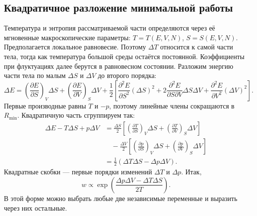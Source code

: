 \documentclass[../final.tex]{subfiles}
\begin{document}
\subsection{Квадратичное разложение минимальной работы}
Температура и энтропия рассматриваемой части определяются через её
мгновенные макроскопические параметры: $T=T(E,V,N)$, $S=S(E,V,N)$.
Предполагается локальное равновесие. Поэтому $\Delta T$ относится к самой
части тела, тогда как температура большой среды остаётся постоянной.
Коэффициенты при флуктуациях далее берутся в равновесном состоянии.
Разложим энергию части тела по малым $\Delta S$ и $\Delta V$
до второго порядка:
\begin{equation*}
 \Delta E=\left(\frac{\partial E}{\partial S}\right)_V\Delta S
 +\left(\frac{\partial E}{\partial V}\right)_S\Delta V
 +\frac12\left[\frac{\partial^2E}{\partial S^2}(\Delta S)^2
 +2\frac{\partial^2E}{\partial S\partial V}\Delta S\Delta V
 +\frac{\partial^2E}{\partial V^2}(\Delta V)^2\right].
\end{equation*}
Первые производные равны $T$ и $-p$, поэтому линейные члены сокращаются
в $R_{\min}$. Квадратичную часть сгруппируем так:
\begin{align*}
 \Delta E-T\Delta S+p\Delta V
 &=\frac{\Delta S}{2}\left[\left(\frac{\partial T}{\partial S}\right)_V\Delta S
 +\left(\frac{\partial T}{\partial V}\right)_S\Delta V\right]\\
 &\quad-\frac{\Delta V}{2}\left[\left(\frac{\partial p}{\partial S}\right)_V\Delta S
 +\left(\frac{\partial p}{\partial V}\right)_S\Delta V\right]\\
 &=\frac12\left(\Delta T\Delta S-\Delta p\Delta V\right).
\end{align*}
Квадратные скобки --- первые порядки изменений $\Delta T$ и $\Delta p$.
Итак,
\begin{equation*}
 w\propto\exp\left(\frac{\Delta p\Delta V-\Delta T\Delta S}{2T}\right).
\end{equation*}
В этой форме можно выбрать любые две независимые переменные
и выразить через них остальные.
\end{document}
